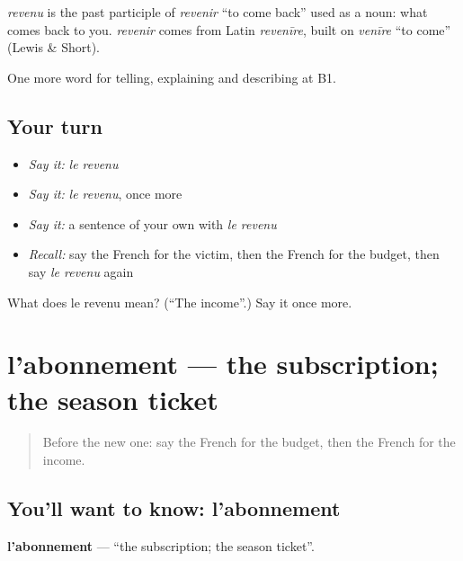 \begin{cousinweb}
\emph{revenu} is the past participle of \emph{revenir} \textquotedblleft{}to come back\textquotedblright{} used as a noun: what comes back to you. \emph{revenir} comes from Latin \emph{revenīre}, built on \emph{venīre} \textquotedblleft{}to come\textquotedblright{} (Lewis \& Short).
\end{cousinweb}

\begin{grammarlens}[title={What you've built}]
One more word for telling, explaining and describing at B1.
\end{grammarlens}

\subsection*{Your turn}
\begin{itemize}
\raggedright
  \item \emph{Say it:} \emph{le revenu}
  \item \emph{Say it:} \emph{le revenu}, once more
  \item \emph{Say it:} a sentence of your own with \emph{le revenu}
  \item \emph{Recall:} say the French for the victim, then the French for the budget, then say \emph{le revenu} again
\end{itemize}

\begin{tcolorbox}[breakable,colback=teal!4,colframe=teal!35!black,title={Before you move on}]
What does le revenu mean? (\textquotedblleft{}The income\textquotedblright{}.) Say it once more.
\end{tcolorbox}
\section[l'abonnement]{l'abonnement — the subscription; the season ticket}

\label{lesson:FR-C390-abonnement}



\begin{quote}
Before the new one: say the French for the budget, then the French for the income.
\end{quote}

\subsection*{You'll want to know: l'abonnement}
\textbf{l'abonnement} — \textquotedblleft{}the subscription; the season ticket\textquotedblright{}.

